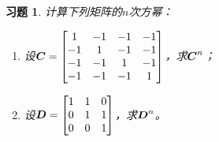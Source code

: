 \documentclass{ctexart}
\newtheorem{problem}{习题}[section]
\begin{document}
\begin{problem}
计算下列矩阵的\(n\)次方幂：

\begin{enumerate}
    \item[(3)] 设\(\boldsymbol{C}=\begin{bmatrix}1&-1&-1&-1\\-1&1&-1&-1\\-1&-1&1&-1\\-1&-1&-1&1\end{bmatrix}\)，求\(\boldsymbol{C}^n\)；
    \item[(4)] 设\(\boldsymbol{D}=\begin{bmatrix}1&1&0\\0&1&1\\0&0&1\end{bmatrix}\)，求\(\boldsymbol{D}^n\)。
\end{enumerate}
\end{problem}
\end{document}
